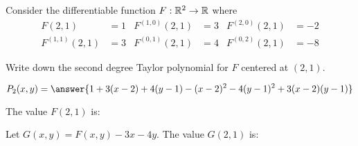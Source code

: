\documentclass{ximera}
\author{Bart Snapp \and Jim Fowler}
\begin{document}
Consider the differentiable function
$F:\mathbb R^2\to\mathbb R$ where
\begin{align*}
  F(2,1) &= 1        &  F^{(1,0)}(2,1) &= 3 & F^{(2,0)}(2,1) &= -2\\
  F^{(1,1)}(2,1) &=3 &  F^{(0,1)}(2,1) &= 4 & F^{(0,2)}(2,1) &= -8  
\end{align*}

\begin{problem}
  Write down the second degree Taylor polynomial for $F$ centered at $(2,1)$.
  \begin{prompt}
    \[
    P_2(x,y) = \answer{1+3(x-2) + 4(y-1)-(x-2)^2-4(y-1)^2+3(x-2)(y-1)}
    \]
  \end{prompt}
\vspace{1in}
\end{problem}



\begin{problem}
  The value $F(2,1)$ is:
  \begin{multipleChoice}
    \pdfOnly{\end{multicols}}
  \end{multipleChoice}
\end{problem}

\begin{problem}
  Let $G(x,y) = F(x,y) - 3x - 4y$. The value $G(2,1)$ is:
  \begin{multipleChoice}
\pdfOnly{\end{multicols}}
\end{multipleChoice}
\end{problem}


\end{document}
